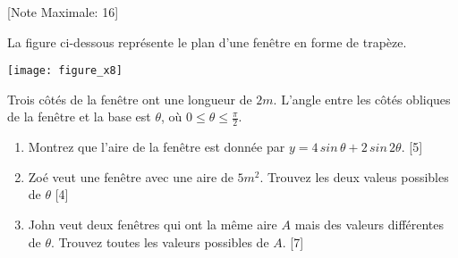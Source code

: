 \begin{question}
  \hspace*{\fill} [Note Maximale: 16]\par
  \medskip
  \begin{center} %
    \noindent La figure ci-dessous représente le plan d'une fenêtre en forme de trapèze.\par
    \texttt{[image: figure\_x8]}\par
  \end{center} %
  \noindent Trois côtés de la fenêtre ont une longueur de $2 m$. L'angle entre les côtés obliques de la fenêtre et la base est $\theta$, où $0 \le \theta \le \frac{\pi}{2}$.\par

  \begin{enumerate}[label=(\alph*)]
    \item Montrez que l'aire de la fenêtre est donnée par $y = 4\,sin\,\theta + 2\,sin\,2\theta$. \hspace*{\fill} [5]
    \item Zoé veut une fenêtre avec une aire de $5 m^2$. Trouvez les deux valeus possibles de $\theta$\hspace*{\fill} [4]
    \item John veut deux fenêtres qui ont la même aire $A$ mais des valeurs différentes de $\theta$. Trouvez toutes les valeurs possibles de $A$.\hspace*{\fill} [7]
  \end{enumerate}
\end{question}
